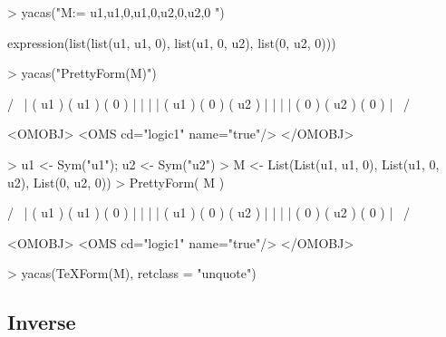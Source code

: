 \documentclass[10pt]{article}
\begin{document}
\begin{Schunk}
\begin{Sinput}
> yacas("M:={ {u1,u1,0},{u1,0,u2},{0,u2,0} }")
\end{Sinput}
\begin{Soutput}
expression(list(list(u1, u1, 0), list(u1, 0, u2), list(0, u2, 
    0)))
\end{Soutput}
\begin{Sinput}
> yacas("PrettyForm(M)")
\end{Sinput}
\begin{Soutput}
/                       \
| ( u1 ) ( u1 ) ( 0 )   |
|                       |
| ( u1 ) ( 0 )  ( u2 )  |
|                       |
| ( 0 )  ( u2 ) ( 0 )   |
\                       /

<OMOBJ>
  <OMS cd="logic1" name="true"/>
</OMOBJ>
\end{Soutput}
\end{Schunk}

\begin{Schunk}
\begin{Sinput}
> u1 <- Sym("u1"); u2 <- Sym("u2")
> M <- List(List(u1, u1, 0), List(u1, 0, u2), List(0, u2, 0))
> PrettyForm( M )
\end{Sinput}
\begin{Soutput}
/                       \
| ( u1 ) ( u1 ) ( 0 )   |
|                       |
| ( u1 ) ( 0 )  ( u2 )  |
|                       |
| ( 0 )  ( u2 ) ( 0 )   |
\                       /

<OMOBJ>
  <OMS cd="logic1" name="true"/>
</OMOBJ>
\end{Soutput}
\end{Schunk}


\begin{Schunk}
\begin{Sinput}
> yacas(TeXForm(M), retclass = "unquote")
\end{Sinput}
\end{Schunk}


\subsection{Inverse}
\end{document}
